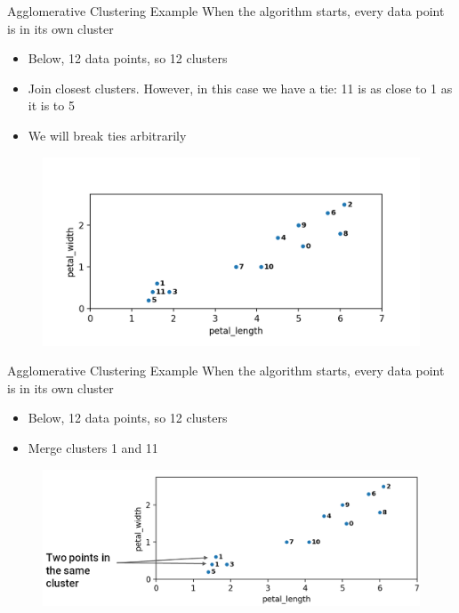 \documentclass[aspectratio=169]{../latex_main/tntbeamer}  %
\begin{document}
	
	\begin{frame}{Agglomerative Clustering Example}
	    When the algorithm starts, every data point is in its own cluster
	    \begin{itemize}
	        \item Below, 12 data points, so 12 clusters
	        \item Join closest clusters. However, in this case we have a tie: 11 is as close to 1 as it is to 5
	        \item We will break ties arbitrarily
	    \end{itemize}
	    \begin{figure}
	        \centering
	        \includegraphics[scale=.5]{Bild29}
	    \end{figure}
	\end{frame}
	
	
	
	\begin{frame}{Agglomerative Clustering Example}
	    When the algorithm starts, every data point is in its own cluster
	    \begin{itemize}
	        \item Below, 12 data points, so 12 clusters
	        \item Merge clusters 1 and 11
	    \end{itemize}
	    \begin{figure}
	        \centering
	        \includegraphics[scale=.35]{Bild30}
	    \end{figure}
	\end{frame}
	
\end{document}
